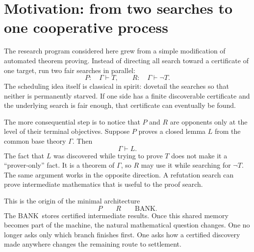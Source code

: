 \documentclass[11pt]{article}
\theoremstyle{remark}
\newcommand{\BANK}{\ensuremath{\mathrm{BANK}}}
\begin{document}
\begin{abstract}
The same framework extends from the original two-role architecture to multi-role automated metalogical deciders (AMLDs), including the five-way ``Pac-Man'' model, Oracle/Omnicartographer guidance, and Universal Settlement Horizons. The geometric synthesis exposes a computability boundary. Individual certified horizon drops can be exact and finite in number, while no uniform algorithm can in general announce that the final strict drop has already occurred. Consequently, local geometric information can be exact without yielding effective knowledge of global completion. The paper distinguishes unconditional shortest-path facts, conservative-\BANK\ facts, and the conditional transfer assumptions still required to lift proof-horizon noncomputability to intended AMLD settlement compilations.
\end{abstract}

\tableofcontents
\newpage

\section{Motivation: from two searches to one cooperative process}

The research program considered here grew from a simple modification of automated theorem proving. Instead of directing all search toward a certificate of one target, run two fair searches in parallel:
\[
P:\quad \Gamma\vdash T,
\qquad
R:\quad \Gamma\vdash \neg T.
\]
The scheduling idea itself is classical in spirit: dovetail the searches so that neither is permanently starved. If one side has a finite discoverable certificate and the underlying search is fair enough, that certificate can eventually be found.

The more consequential step is to notice that $P$ and $R$ are opponents only at the level of their terminal objectives. Suppose $P$ proves a closed lemma $L$ from the common base theory $\Gamma$. Then
\[
\Gamma\vdash L.
\]
The fact that $L$ was discovered while trying to prove $T$ does not make it a ``prover-only'' fact. It is a theorem of $\Gamma$, so $R$ may use it while searching for $\neg T$. The same argument works in the opposite direction. A refutation search can prove intermediate mathematics that is useful to the proof search.

This is the origin of the minimal architecture
\[
\boxed{P\qquad R\qquad \BANK.}
\]
The \BANK\ stores certified intermediate results. Once this shared memory becomes part of the machine, the natural mathematical question changes. One no longer asks only which branch finishes first. One asks how a certified discovery made anywhere changes the remaining route to settlement.
\end{document}
